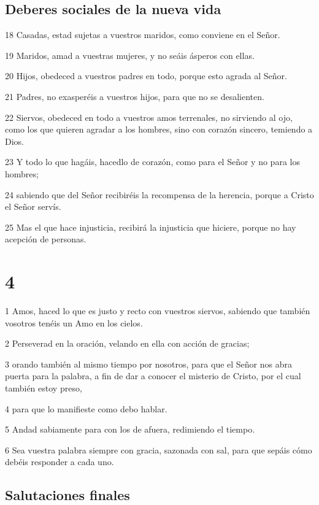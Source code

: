 \section*{Deberes sociales de la nueva vida}

\par 18 Casadas, estad sujetas a vuestros maridos, como conviene en el Señor.
\par 19 Maridos, amad a vuestras mujeres, y no seáis ásperos con ellas.
\par 20 Hijos, obedeced a vuestros padres en todo, porque esto agrada al Señor.
\par 21 Padres, no exasperéis a vuestros hijos, para que no se desalienten.
\par 22 Siervos, obedeced en todo a vuestros amos terrenales, no sirviendo al ojo, como los que quieren agradar a los hombres, sino con corazón sincero, temiendo a Dios.
\par 23 Y todo lo que hagáis, hacedlo de corazón, como para el Señor y no para los hombres;
\par 24 sabiendo que del Señor recibiréis la recompensa de la herencia, porque a Cristo el Señor servís.
\par 25 Mas el que hace injusticia, recibirá la injusticia que hiciere, porque no hay acepción de personas.

\chapter{4}

\par 1 Amos, haced lo que es justo y recto con vuestros siervos, sabiendo que también vosotros tenéis un Amo en los cielos.
\par 2 Perseverad en la oración, velando en ella con acción de gracias;
\par 3 orando también al mismo tiempo por nosotros, para que el Señor nos abra puerta para la palabra, a fin de dar a conocer el misterio de Cristo, por el cual también estoy preso,
\par 4 para que lo manifieste como debo hablar.
\par 5 Andad sabiamente para con los de afuera, redimiendo el tiempo.
\par 6 Sea vuestra palabra siempre con gracia, sazonada con sal, para que sepáis cómo debéis responder a cada uno.

\section*{Salutaciones finales}

